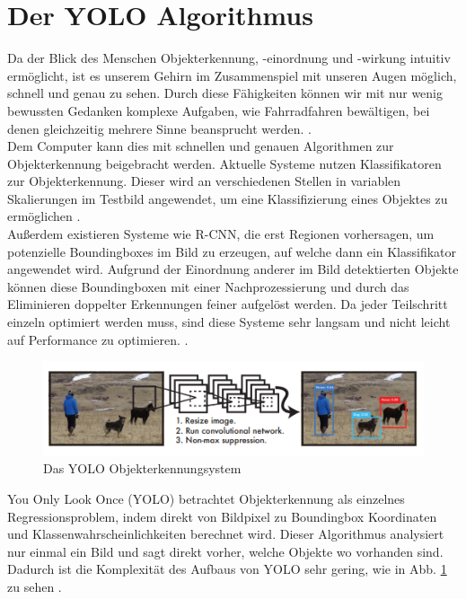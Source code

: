 {	\section{Der YOLO Algorithmus \label{subsec:YOLO_Alg}} 
	{Da der Blick des Menschen Objekterkennung, -einordnung und -wirkung intuitiv ermöglicht, ist es unserem Gehirn im Zusammenspiel mit unseren Augen möglich, schnell und genau zu sehen. Durch diese Fähigkeiten können wir mit nur wenig bewussten Gedanken komplexe Aufgaben, wie Fahrradfahren bewältigen, bei denen gleichzeitig mehrere Sinne beansprucht werden. \citep{Redmon2016}. \\
	Dem Computer kann dies mit schnellen und genauen Algorithmen zur Objekterkennung beigebracht werden. Aktuelle Systeme nutzen Klassifikatoren zur Objekterkennung. Dieser wird an verschiedenen Stellen in variablen Skalierungen im Testbild angewendet, um eine Klassifizierung eines Objektes zu ermöglichen \citep{Redmon2016}. \\ 
	Außerdem existieren Systeme wie R-CNN, die erst Regionen vorhersagen, um potenzielle Boundingboxes im Bild zu erzeugen, auf welche dann ein Klassifikator angewendet wird. Aufgrund der Einordnung anderer im Bild detektierten Objekte können diese Boundingboxen mit einer Nachprozessierung und durch das Eliminieren doppelter Erkennungen feiner aufgelöst werden. Da jeder Teilschritt einzeln optimiert werden muss, sind diese Systeme sehr langsam und nicht leicht auf Performance zu optimieren. \citep{Redmon2016}. \\
	\begin{figure}[ht]
		\centering
		\includegraphics*[scale = 1, keepaspectratio, trim=2 2 2 2 ]{images/YOLO/YOLO_detection_system.png}
		\caption[Das YOLO Objekterkennungsystem]{Das YOLO Objekterkennungsystem \citep{Redmon2016}}
		\label{YOLO_Objectdetection}
 	\end{figure}\glqq You Only Look Once\grqq{} (YOLO) betrachtet Objekterkennung als einzelnes Regressionsproblem, indem direkt von Bildpixel zu Boundingbox Koordinaten und Klassenwahrscheinlichkeiten berechnet wird. Dieser Algorithmus analysiert nur einmal ein Bild und sagt direkt vorher, welche Objekte wo vorhanden sind. Dadurch ist die Komplexität des  Aufbaus von YOLO sehr gering, wie in Abb. \ref{YOLO_Objectdetection} zu sehen \citep{Redmon2016}. \\
}}
